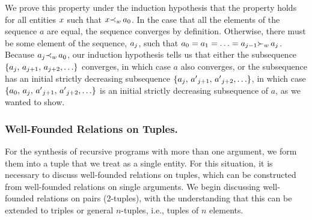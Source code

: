 \documentclass[runningheads]{llncs}
\DeclareMathOperator{\uand}{\emph{and}\,}
\DeclareMathOperator{\uiff}{\iff}
\begin{document}
 We prove this property under the induction hypothesis that the property holds for all entities $x$ such that $x {\prec}_{w} \, {a}_{0}$. 
 In the case that all the elements of the sequence $a$ are equal, the sequence converges by definition.  Otherwise, there must be some element of the sequence, ${a}_{j}$, such that ${a}_{0} = {a}_{1} = \ldots = {a}_{j-1} {\succ}_{w} \, {a}_{j}$.  Because 
 $ {a}_{j}{\prec}_{w} \, {a}_{0}$,
 our induction hypothesis tells us that either the subsequence  $\{{a}_{j}, \,  {a}_{j+1}, \,  {a}_{j+2}, \ldots\}$  converges, in which case $a$ also converges,  or the subsequence  has an initial strictly decreasing subsequence $\{{a}_{j}, \,  {a'}_{j+1}, \, {a'}_{j+2}, \ldots\}$, in which case $\{{a}_{0}, \, {a}_{j}, \, {a'}_{j+1}, \,  {a'}_{j+2}, \ldots\}$  is an initial strictly decreasing subsequence of $a$, as we wanted to show.

\subsubsection{Well-Founded Relations on Tuples.} For the synthesis of recursive programs with more than one argument, we form them into a tuple that we treat as a single entity.  For this situation, it is necessary to discuss well-founded relations on tuples, which can be constructed from well-founded relations on single arguments.  We begin discussing well-founded relations on pairs (2-tuples), with the understanding that this can be extended to triples or general $n$-tuples, i.e.,  tuples of $n$ elements.

 
 
\end{document}
